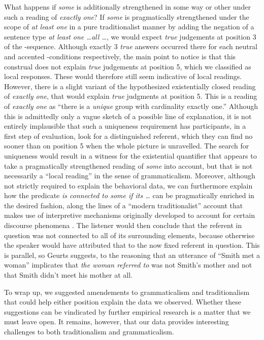 \documentclass[fleqn,reqno,10pt]{article}
\renewcommand{\es}{\acro{es}}
\begin{document}
What happens if \emph{some} is additionally strengthened in some way
or other under such a reading of \emph{exactly one}? If \emph{some} is
pragmatically strengthened under the scope of \emph{at least one} in a
pure traditionalist manner by adding the negation of a sentence type
\emph{at least one \dots all \dots}, we would expect \emph{true}
judgements at position 3 of the \es-sequence. Although exactly 3
\emph{true} answers occurred there for each neutral and accented
\es-conditions respectively, the main point to notice is that this
construal does not explain \emph{true} judgements at position 5, which
we classified as local responses. These would therefore still seem
indicative of local readings. However, there is a slight variant of
the hypothesized existentially closed reading of \emph{exactly one},
that would explain \emph{true} judgments at position 5. This is a
reading of \emph{exactly one} as ``there is a \emph{unique} group with
cardinality exactly one.''  Although this is admittedly only a vague
sketch of a possible line of explanation, it is not entirely
implausible that such a uniqueness requirement has participants, in a
first step of evaluation, look for a distinguished referent, which
they can find no sooner than on position 5 when the whole picture is
unravelled. The search for uniqueness would result in a witness for
the existential quantifier that appears to take a pragmatically
strengthened reading of \emph{some} into account, but that is not
necessarily a ``local reading'' in the sense of
grammaticalism. Moreover, although not strictly required to explain
the behavioral data, we can furthermore explain how the predicate
\emph{is connected to some if its \dots} can be pragmatically enriched
in the desired fashion, along the lines of a ``modern traditionalist''
account that makes use of interpretive mechanisms originally developed
to account for certain discourse phenomena
\citep[][Chapter~8.4]{Geurts2010:Quantity-Implic}. The listener would
then conclude that the referent in question was not connected to all
of its surrounding elements, because otherwise the speaker would have
attributed that to the now fixed referent in question. This is
parallel, so Geurts suggests, to the reasoning that an utterance of
``Smith met a woman'' implicates that \emph{the woman referred to} was
not Smith's mother and not that Smith didn't meet his mother at all.

To wrap up, we suggested amendements to grammaticalism and
traditionalism that could help either position explain the data we
observed. Whether these suggestions can be vindicated by further
empirical research is a matter that we must leave open. It remains,
however, that our data provides interesting challenges to both
traditionalism and grammaticalism.
\end{document}
